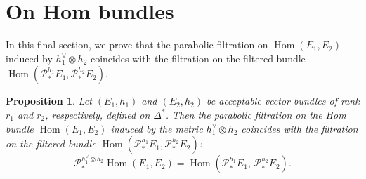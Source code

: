 \documentclass[12pt,twoside]{amsart}
\DeclareMathOperator{\Hom}{Hom}
\newtheorem{prop}[thm]{Proposition}
\theoremstyle{definition}
\begin{document}
\section{On Hom bundles}\label{p-sec17}

In this final section, we prove that the parabolic filtration on 
$\Hom (E_1, E_2)$ induced by 
$h^\vee _1\otimes h_2$ coincides with the filtration on the filtered bundle 
$\Hom(\mathcal{P}^{h_1}_\ast E_1,  \mathcal{P}^{h_2}_\ast E_2)$. 

\begin{prop}\label{p-prop17.1}
Let \( (E_1, h_1) \) and \( (E_2, h_2) \) be 
acceptable vector bundles of 
rank \( r_1 \) and \( r_2 \), respectively, defined on \( \Delta^* \).  
Then the parabolic filtration 
on the Hom bundle \(\Hom(E_1, E_2) \) induced by the 
metric \( h_1^\vee \otimes h_2 \) coincides with the filtration on the filtered bundle 
$\Hom(\mathcal{P}^{h_1}_\ast E_1, \mathcal{P}^{h_2}_\ast E_2)$: 
\[
\mathcal{P}^{h_1^\vee \otimes h_2}_\ast \Hom(E_1, E_2) = 
\Hom(\mathcal{P}^{h_1}_\ast E_1,\, \mathcal{P}^{h_2}_\ast E_2).
\]
\end{prop}
\end{document}
